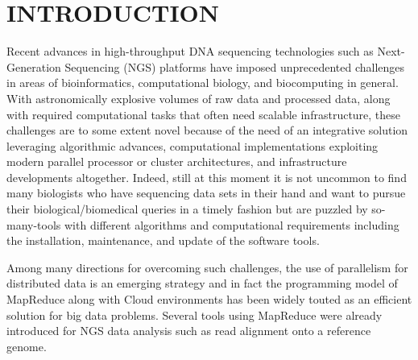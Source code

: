 \documentclass{sig-alternate}
\begin{document}
 






\section{INTRODUCTION} 
Recent advances in high-throughput DNA sequencing technologies such as Next-Generation Sequencing (NGS) platforms have imposed unprecedented challenges in areas of bioinformatics, computational biology, and biocomputing in general\cite{metzker2010,1000genome,wang2009-natrevgen,alex2009,mcpherson2009}.  With astronomically explosive volumes of raw data and processed data, along with required computational tasks that often need scalable infrastructure, these challenges are to some extent novel because of the need of an integrative solution leveraging algorithmic advances, computational implementations exploiting modern parallel processor or cluster architectures, and infrastructure developments altogether. Indeed, still at this moment it is not uncommon to find many biologists who have sequencing data sets in their hand and want to pursue their biological/biomedical queries in a timely fashion but are puzzled by so-many-tools with different algorithms and computational requirements including the installation, maintenance, and update of the software tools. 

Among many directions for overcoming such challenges, the use of parallelism for distributed data is an emerging strategy and in fact the programming model of MapReduce along with Cloud environments has been widely touted as an efficient solution for big data problems\cite{mapreduce-2004-dean,schatz-nature-biotech-2010, taylor2010}.  Several tools using MapReduce were already introduced for NGS data analysis such as read alignment onto a reference genome\cite{cloudburst, gatk,langmead2009,seal2011,langmead2010, taylor2010}.
\end{document}
